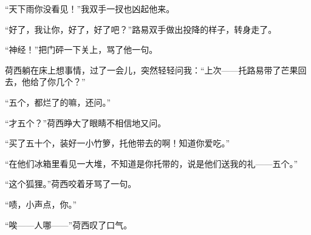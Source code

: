 \par “天下雨你没看见！”我双手一扠也凶起他来。
\par “好了，我让你，好了，好了吧？”路易双手做出投降的样子，转身走了。
\par “神经！”把门砰一下关上，骂了他一句。
\par 荷西躺在床上想事情，过了一会儿，突然轻轻问我：“上次——托路易带了芒果回去，他给了你几个？”
\par “五个，都烂了的嘛，还问。”
\par “才五个？”荷西睁大了眼睛不相信地又问。
\par “买了五十个，装好一小竹箩，托他带去的啊！知道你爱吃。”
\par “在他们冰箱里看见一大堆，不知道是你托带的，说是他们送我的礼——五个。”
\par “这个狐狸。”荷西咬着牙骂了一句。
\par “啧，小声点，你。”
\par “唉——人哪——”荷西叹了口气。




